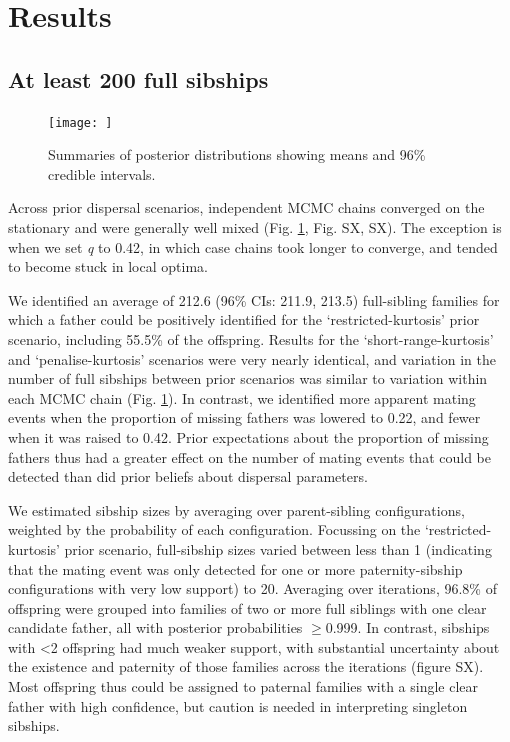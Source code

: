 \documentclass[10pt, a4paper, twocolumn]{article} %
\begin{document}
\section{Results}

\subsection{At least 200 full sibships}

\begin{figure}
\texttt{[image: ]}
\caption{Summaries of posterior distributions showing means and 96\% credible intervals.}
\label{posterior_summaries}
\end{figure}

Across prior dispersal scenarios, independent MCMC chains converged on the stationary and were generally well mixed (Fig. \ref{posterior_summaries}, Fig. SX, SX). The exception is when we set \textit{q} to 0.42, in which case chains took longer to converge, and tended to become stuck in local optima.

We identified an average of 212.6 (96\% CIs: 211.9, 213.5) full-sibling families for which a father could be positively identified for the ‘restricted-kurtosis’ prior scenario, including 55.5\% of the offspring. Results for the ‘short-range-kurtosis’ and ‘penalise-kurtosis’ scenarios were very nearly identical, and variation in the number of full sibships between prior scenarios was similar to variation within each MCMC chain (Fig. \ref{posterior_summaries}). In contrast, we identified more apparent mating events when the proportion of missing fathers was lowered to 0.22, and fewer when it was raised to 0.42. Prior expectations about the proportion of missing fathers thus had a greater effect on the number of mating events that could be detected than did prior beliefs about dispersal parameters.

We estimated sibship sizes by averaging over parent-sibling configurations, weighted by the probability of each configuration. Focussing on the ‘restricted-kurtosis’ prior scenario, full-sibship sizes varied between less than 1 (indicating that the mating event was only detected for one or more paternity-sibship configurations with very low support) to 20. Averaging over iterations, 96.8\% of offspring were grouped into families of two or more full siblings with one clear candidate father, all with posterior probabilities $\geq$0.999. In contrast, sibships with <2 offspring had much weaker support, with substantial uncertainty about the existence and paternity of those families across the iterations (figure SX). Most offspring thus could be assigned to paternal families with a single clear father with high confidence, but caution is needed in interpreting singleton sibships.
\end{document}

